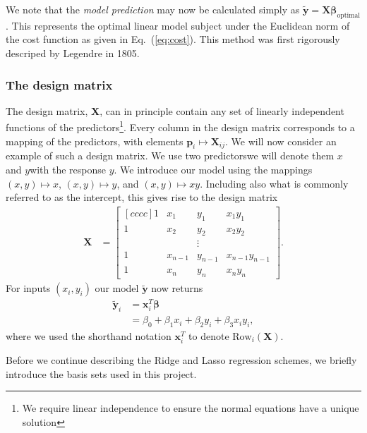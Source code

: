 \documentclass[a4paper]{article}
\newcommand{\eq} [1]{Eq.\ (\ref{eq:#1})}
\newcommand{\bmat}[2]{\begin{bmatrix}[#1] #2 \end{bmatrix}}  %
\begin{document}
\begin{multicols}{2}
We note that the \textit{model prediction} may now be calculated simply as $\tilde{\mathbf{y}}=\mathbf{X}\bm\beta_\text{optimal}$. This represents the optimal linear model subject under the Euclidean norm of the cost function as given in \eq{cost}. This method was first rigorously descriped by Legendre in 1805\autocite{legendre1805nouvelles}.

\subsubsection{The design matrix}
The design matrix, $\mathbf{X}$, can in principle contain any set of linearly independent functions of the predictors\footnote{We require linear independence to ensure the normal equations have a unique solution}. Every column in the design matrix corresponds to a mapping of the predictors, with elements $\mathbf{p}_i\mapsto \mathbf{X}_{ij}$. We will now consider an example of such a design matrix. We use two predictors\textemdash we will denote them $x$ and $y$\textemdash with the response $y$. We introduce our model using the mappings $(x,y)\mapsto x$, $(x,y)\mapsto y$, and $(x,y)\mapsto xy$. Including also what is commonly referred to as the intercept, this gives rise to the design matrix 
\begin{align}
\mathbf{X} &= \bmat{cccc}{
  1 & x_1 & y_1 & x_1y_1 \\
  1 & x_2 & y_2 & x_2y_2 \\
    &     & \vdots       \\
  1 & x_{n-1} & y_{n-1} & x_{n-1}y_{n-1} \\
  1 & x_n & y_n & x_ny_n}.
\end{align}
For inputs $(x_i,y_i)$ our model $\tilde{\mathbf{y}}$ now returns 
\begin{align}
\tilde{\mathbf{y}}_i &= \mathbf{x}^T_i\bm\beta \nonumber \\
&= \beta_0 + \beta_1 x_i + \beta_2 y_i + \beta_3 x_iy_i,
\end{align}
where we used the shorthand notation $\mathbf{x}^T_i$ to denote $\text{Row}_i(\mathbf{X})$.


Before we continue describing the Ridge and Lasso regression schemes, we briefly introduce the basis sets used in this project.

\end{multicols}
\end{document}
